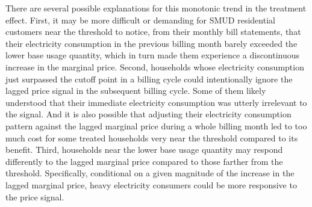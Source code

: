 
There are several possible explanations for this monotonic trend in the treatment effect. First, it may be more difficult or demanding for SMUD residential customers near the threshold to notice, from their monthly bill statements, that their electricity consumption in the previous billing month barely exceeded the lower base usage quantity, which in turn made them experience a discontinuous increase in the marginal price. Second, households whose electricity consumption just surpassed the cutoff point in a billing cycle could intentionally ignore the lagged price signal in the subsequent billing cycle. Some of them likely understood that their immediate electricity consumption was utterly irrelevant to the signal. And it is also possible that adjusting their electricity consumption pattern against the lagged marginal price during a whole billing month led to too much cost for some treated households very near the threshold compared to its benefit. Third, households near the lower base usage quantity may respond differently to the lagged marginal price compared to those farther from the threshold. Specifically, conditional on a given magnitude of the increase in the lagged marginal price, heavy electricity consumers could be more responsive to the price signal. 

